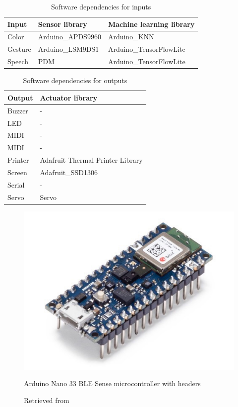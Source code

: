 \begin{table}[ht]
    \centering
    \begin{tabular}{ | l | l | l |}
        \hline
        \textbf{Input}  & \textbf{Sensor library} & \textbf{Machine learning library} \\
        \hline
        Color &  Arduino{\_}APDS9960 & Arduino{\_}KNN \\
        \hline
        Gesture & Arduino{\_}LSM9DS1 & Arduino{\_}TensorFlowLite \\
        \hline
        Speech & PDM & Arduino{\_}TensorFlowLite \\
        \hline
    \end{tabular}
    \caption{Software dependencies for inputs}
    \label{table:software-dependencies-inputs}
\end{table}{}

\begin{table}[ht]
    \centering
    \begin{tabular}{ | l | l | }
        \hline
        \textbf{Output}  & \textbf{Actuator library} \\
        \hline
        Buzzer & - \\
        \hline
        LED & - \\
        \hline
        MIDI & - \\
        \hline
        MIDI & - \\
        \hline
        Printer & Adafruit Thermal Printer Library\\
        \hline
        Screen & Adafruit{\_}SSD1306\\ 
        \hline
        Serial & - \\
        \hline
        Servo & Servo\\
        \hline
    \end{tabular}
    \caption{Software dependencies for outputs}
    \label{software-dependencies-outputs}
\end{table}{}

\begin{figure}[ht]
  \centering
  \includegraphics[width=0.75\linewidth,height=0.25\textheight,keepaspectratio]{images/materials-arduino-nano-33-ble-sense.jpg}
  \caption{Arduino Nano 33 BLE Sense microcontroller with headers}
  \caption*{Retrieved from \cite{website-materials-arduino-nano-33-ble-sense}}
  \label{fig:materials-arduino-nano-33-ble-sense}
\end{figure}

